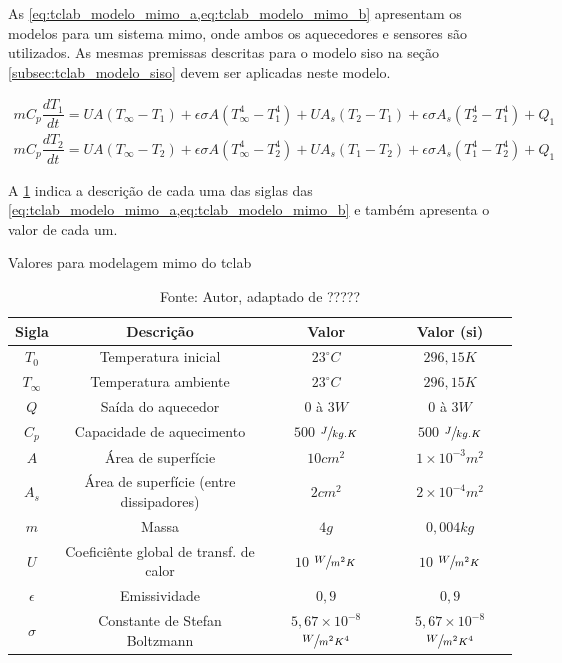 As \cref{eq:tclab_modelo_mimo_a,eq:tclab_modelo_mimo_b} apresentam os modelos
para um sistema \acrshort{mimo}, onde ambos os aquecedores e sensores são utilizados.
As mesmas premissas descritas para o modelo \acrshort{siso} na seção \ref{subsec:tclab_modelo_siso}
devem ser aplicadas neste modelo.

\begin{subequations}
	\label{eq:tclab_modelo_mimo}
	\begin{gather}
		mC_p \dfrac{dT_1}{dt} = UA (T_{\infty} - T_1) + \epsilon \sigma A (T_{\infty}^{4} - T_{1}^{4}) + UA_s (T_2 - T_1) + \epsilon \sigma A_s (T_{2}^{4} - T_{1}^{4}) + Q_1		\label{eq:tclab_modelo_mimo_a} \\
		mC_p \dfrac{dT_2}{dt} = UA (T_{\infty} - T_2) + \epsilon \sigma A (T_{\infty}^{4} - T_{2}^{4}) + UA_s (T_1 - T_2) + \epsilon \sigma A_s (T_{1}^{4} - T_{2}^{4}) + Q_1		\label{eq:tclab_modelo_mimo_b}
	\end{gather}
\end{subequations}

A \cref{tab:tclab_modelo_mimo_valores} indica a descrição de cada uma das siglas das
\cref{eq:tclab_modelo_mimo_a,eq:tclab_modelo_mimo_b} e também apresenta o valor de cada um.

\begin{table}[h]
	\centering
	\caption{Valores para modelagem \acrshort{mimo} do \acrshort{tclab}}
	\label{tab:tclab_modelo_mimo_valores}
	\begin{tabular}{cccc} \toprule
		{Sigla} 		& {Descrição} 								& {Valor} 											& {Valor (\acrshort{si})} 							\\ \midrule
		$T_{0}$ 		& Temperatura inicial 						& $23^\circ C$ 										& $296{,}15 K $										\\
		$T_{\infty}$	& Temperatura ambiente						& $23^\circ C$										& $296{,}15 K $										\\
		$Q$				& Saída do aquecedor						& $0$ à $3 W$										& $0$ à $3 W$										\\
		$C_p$			& Capacidade de aquecimento					& $500$ $\sfrac{J}{kg.K}$							& $500$ $\sfrac{J}{kg.K}$							\\
		$A$				& Área de superfície						& $10 cm^{2}$										& $1{\times}10^{-3} m^{2}$							\\
		$A_s$			& Área de superfície (entre dissipadores)	& $2 cm^{2}$										& $2{\times}10^{-4} m^{2}$							\\
		$m$				& Massa										& $4 g$												& $0{,}004 kg	$									\\
		$U$				& Coeficiênte global de transf. de calor	& $10$ $\sfrac{W}{m^{2}K}$							& $10$ $\sfrac{W}{m^{2}K}$							\\
		$\epsilon$		& Emissividade								& $0{,}9$											& $0{,}9$											\\
		$\sigma$		& Constante de Stefan Boltzmann				& $5{,}67{\times}10^{-8}$ $\sfrac{W}{m^{2}K^{4}}$	& $5{,}67{\times}10^{-8}$ $\sfrac{W}{m^{2}K^{4}}$	\\ \bottomrule
	\end{tabular}
	\caption*{Fonte: Autor, adaptado de ?????}		%
\end{table}